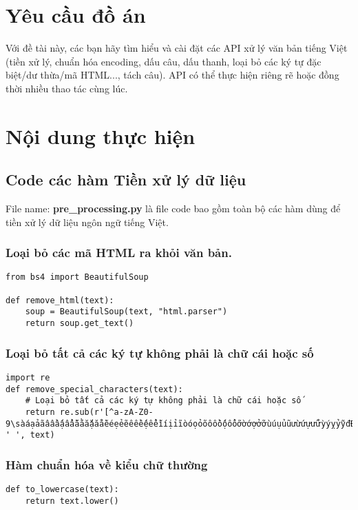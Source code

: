 
\section{Yêu cầu đồ án}
Với đề tài này, các bạn hãy tìm hiểu và cài đặt các API xử lý văn bản tiếng Việt (tiền xử lý, chuẩn hóa encoding, dấu câu, dấu thanh, loại bỏ các ký tự đặc biệt/dư thừa/mã HTML..., tách câu). API có thể thực hiện riêng rẽ hoặc đồng thời nhiều thao tác cùng lúc.

\section{Nội dung thực hiện}
\subsection{Code các hàm Tiền xử lý dữ liệu}
File name: \textbf{ pre\_processing.py} là file code bao gồm toàn bộ các hàm dùng để tiền xử lý dữ liệu ngôn ngữ tiếng Việt.

\subsubsection{Loại bỏ các mã HTML ra khỏi văn bản.}

\begin{verbatim}
from bs4 import BeautifulSoup

def remove_html(text):
    soup = BeautifulSoup(text, "html.parser")
    return soup.get_text()
\end{verbatim}
    

\subsubsection{Loại bỏ tất cả các ký tự không phải là chữ cái hoặc số}
\begin{verbatim}
import re
def remove_special_characters(text):
    # Loại bỏ tất cả các ký tự không phải là chữ cái hoặc số
    return re.sub(r'[^a-zA-Z0-9\sàáạảãâầấậẩẫăằắặẳẵèéẹẻẽêềếệểễìíịỉĩòóọỏõôồốộổỗơờớợởỡùúụủũưừứựửữỳýỵỷỹđĐÀÁẠẢÃÂẦẤẬẨẪĂẰẮẶẲẴÈÉẸẺẼÊỀẾỆỂỄÌÍỊỈĨÒÓỌỎÕÔỒỐỘỔỖƠỜỚỢỞỠÙÚỤỦŨƯỪỨỰỬỮỲÝỴỶỸ.!?]', ' ', text)
\end{verbatim}

\subsubsection{Hàm chuẩn hóa về kiểu chữ thường}

\begin{verbatim}
def to_lowercase(text):
    return text.lower()
\end{verbatim}

